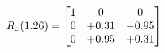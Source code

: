 \documentclass[preview]{standalone}
\begin{document}
\begin{align*}
\special{dvisvgm:raw <g id='unique000'>}R_{x}(1.26) = \begin{bmatrix}1 & 0 & 0 \\0 & +0.31 & -0.95 \\0 & +0.95 & +0.31\end{bmatrix}\special{dvisvgm:raw </g>}
\end{align*}
\end{document}
